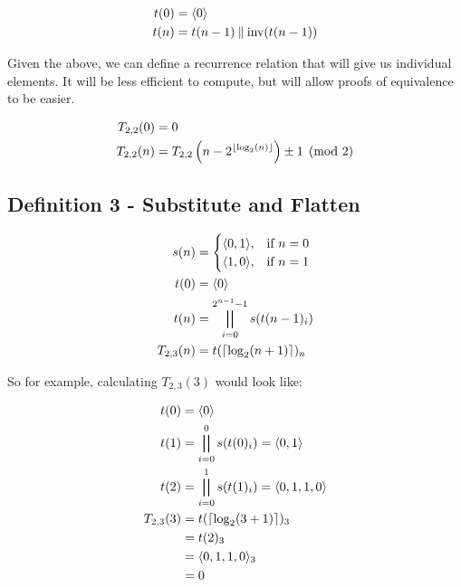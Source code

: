 \documentclass[conference]{IEEEtran}
\begin{document}
\begin{equation}
    \begin{aligned}
t(0) &= \langle 0 \rangle \\
t(n) &= t(n - 1) \mathbin{\|} \text{inv}(t(n - 1))
    \end{aligned}
\end{equation}

Given the above, we can define a recurrence relation that will give us individual elements. It will be less efficient to compute, but will allow proofs of equivalence to be easier.

\begin{equation}
    \label{eq:p2d02}
    \begin{aligned}
T_{2,2}(0) &= 0 \\
T_{2,2}(n) &= T_{2,2}\left(n - 2^{\floor{\log_2(n)}}\right) \pm 1 \pmod{2}
    \end{aligned}
\end{equation}

\subsection{Definition 3 - Substitute and Flatten}


\begin{equation}
    \label{eq:p2d03}
    \begin{aligned}
      s(n) &= \begin{cases}
          \tuple{0, 1}, & \text{if } n = 0 \\
          \tuple{1, 0}, & \text{if } n = 1
      \end{cases} \\
      t(0) &= \tuple{0} \\
      t(n) &= \bigparallel_{i=0}^{2^{n-1}-1} s(t(n-1)_i)  \\
T_{2,3}(n) &= t(\ceil{\log_2(n + 1)})_n
    \end{aligned}
\end{equation}

So for example, calculating $T_{2,3}(3)$ would look like:

\begin{equation*}
    \begin{aligned}
      t(0) &= \langle 0 \rangle \\
      t(1) &= \bigparallel_{i=0}^{0} s(t(0)_i) = \langle 0, 1 \rangle \\
      t(2) &= \bigparallel_{i=0}^{1} s(t(1)_i) = \langle 0, 1, 1, 0 \rangle \\
T_{2,3}(3) &= t(\left\lceil \log_2(3 + 1) \right\rceil)_3 \\
           &= t(2)_3 \\
           &= \langle 0, 1, 1, 0 \rangle_3 \\
           &= 0
    \end{aligned}
\end{equation*}
\end{document}
